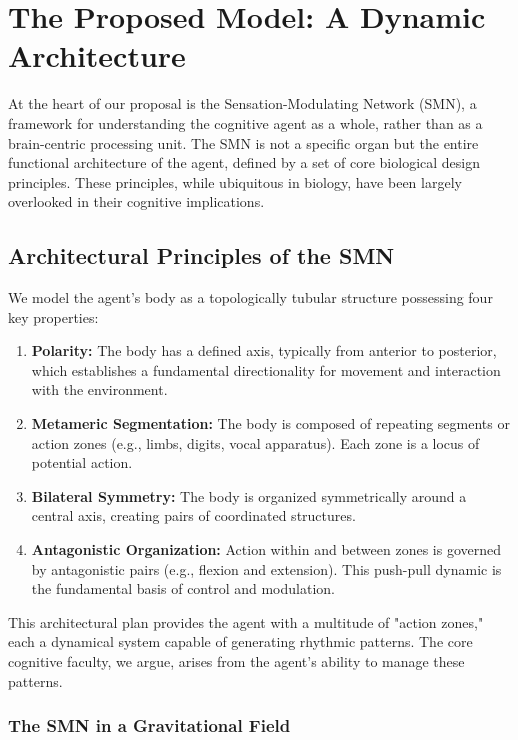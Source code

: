 \documentclass[10pt,letterpaper]{article}
\begin{document}
\section{The Proposed Model: A Dynamic Architecture}
At the heart of our proposal is the Sensation-Modulating Network (SMN), a framework for understanding the cognitive agent as a whole, rather than as a brain-centric processing unit. The SMN is not a specific organ but the entire functional architecture of the agent, defined by a set of core biological design principles. These principles, while ubiquitous in biology, have been largely overlooked in their cognitive implications.

\subsection*{Architectural Principles of the SMN}
We model the agent's body as a topologically tubular structure possessing four key properties:
\begin{enumerate}
    \item \textbf{Polarity:} The body has a defined axis, typically from anterior to posterior, which establishes a fundamental directionality for movement and interaction with the environment.
    \item \textbf{Metameric Segmentation:} The body is composed of repeating segments or action zones (e.g., limbs, digits, vocal apparatus). Each zone is a locus of potential action.
    \item \textbf{Bilateral Symmetry:} The body is organized symmetrically around a central axis, creating pairs of coordinated structures.
    \item \textbf{Antagonistic Organization:} Action within and between zones is governed by antagonistic pairs (e.g., flexion and extension). This push-pull dynamic is the fundamental basis of control and modulation.
\end{enumerate}
This architectural plan provides the agent with a multitude of "action zones," each a dynamical system capable of generating rhythmic patterns. The core cognitive faculty, we argue, arises from the agent's ability to manage these patterns.

\subsubsection*{The SMN in a Gravitational Field}
\end{document}
